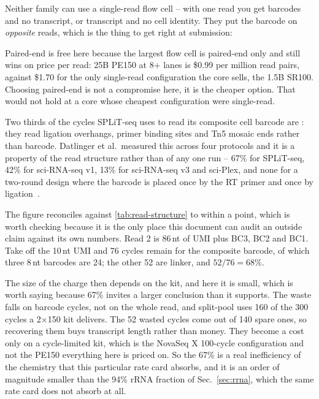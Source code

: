  Neither family
can use a single-read flow cell -- with one read you get barcodes and no
transcript, or transcript and no cell identity. They put the barcode on
\emph{opposite} reads, which is the thing to get right at submission:



Paired-end is free here because the largest flow cell is paired-end only and still
wins on price per read: 25B PE150 at 8+ lanes is \$0.99 per million read pairs,
against \$1.70 for the only single-read configuration the core sells, the 1.5B
SR100. Choosing paired-end is not a compromise here, it is the cheaper option.
That would not hold at a core whose cheapest configuration were single-read.

 Two thirds
of the cycles SPLiT-seq uses to read its composite cell barcode are
: they read ligation overhangs, primer binding sites and Tn5
mosaic ends rather than barcode. Datlinger et al.\ measured this across four
protocols and it is a property of the read structure rather than of any one run
-- 67\% for SPLiT-seq, 42\% for sci-RNA-seq v1, 13\% for sci-RNA-seq v3 and
sci-Plex, and none for a two-round design where the barcode is placed once by the
RT primer and once by
ligation~\citep{datlingerUltrahighthroughputSinglecellRNA2021}.

The figure reconciles against \cref{tab:read-structure} to within a point, which is worth
checking because it is the only place this document can audit an outside claim
against its own numbers. Read 2 is 86\,nt of UMI plus BC3, BC2 and BC1. Take off
the 10\,nt UMI and 76 cycles remain for the composite barcode, of which three
8\,nt barcodes are 24; the other 52 are linker, and $52/76 = 68\%$.

The size of the charge then depends on the kit, and here it is small, which is
worth saying because 67\% invites a larger conclusion than it supports. The waste
falls on barcode cycles, not on the whole read, and split-pool uses 160 of the 300
cycles a 2$\times$150 kit delivers. The 52 wasted cycles come out of 140 spare
ones, so recovering them buys transcript length rather than money. They become a
cost only on a cycle-limited kit, which is the NovaSeq X 100-cycle configuration
and not the PE150 everything here is priced on. So the 67\% is a real
inefficiency of the chemistry that this particular rate card absorbs, and it is
an order of magnitude smaller than the 94\% rRNA fraction of
Sec.~\ref{sec:rrna}, which the same rate card does not absorb at all.

